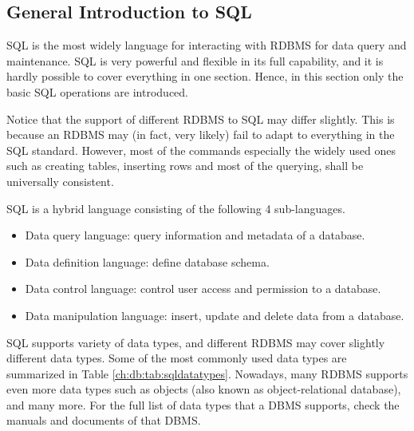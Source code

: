 \subsection{General Introduction to SQL}

SQL is the most widely language for interacting with RDBMS for data query and maintenance. SQL is very powerful and flexible in its full capability, and it is hardly possible to cover everything in one section. Hence, in this section only the basic SQL operations are introduced.

Notice that the support of different RDBMS to SQL may differ slightly. This is because an RDBMS may (in fact, very likely) fail to adapt to everything in the SQL standard. However, most of the commands especially the widely used ones such as creating tables, inserting rows and most of the querying, shall be universally consistent.

SQL is a hybrid language consisting of the following 4 sub-languages.
\begin{itemize}
  \item Data query language: query information and metadata of a database.
  \item Data definition language: define database schema.
  \item Data control language: control user access and permission to a database.
  \item Data manipulation language: insert, update and delete data from a database.
\end{itemize}

SQL supports variety of data types, and different RDBMS may cover slightly different data types. Some of the most commonly used data types are summarized in Table \ref{ch:db:tab:sqldatatypes}. Nowadays, many RDBMS supports even more data types such as objects (also known as object-relational database), and many more. For the full list of data types that a DBMS supports, check the manuals and documents of that DBMS.

